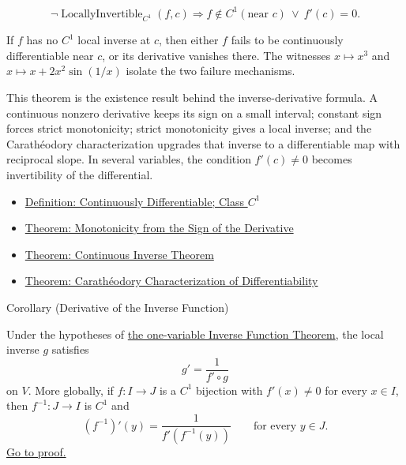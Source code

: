 \begin{remark*}
\[
  \neg\operatorname{LocallyInvertible}_{C^1}(f,c)
  \Longrightarrow
  f\notin C^1(\text{near }c)\ \vee\ f'(c)=0.
\]
\end{remark*}

\begin{remark*}
If \(f\) has no \(C^1\) local inverse at \(c\), then either \(f\) fails to be
continuously differentiable near \(c\), or its derivative vanishes there.
The witnesses \(x\mapsto x^3\) and \(x\mapsto x+2x^2\sin(1/x)\) isolate the
two failure mechanisms.
\end{remark*}

\begin{remark*}[Interpretation]
This theorem is the existence result behind the inverse-derivative formula. A continuous nonzero derivative keeps its sign on a small interval; constant sign forces strict monotonicity; strict monotonicity gives a local inverse; and the Carath\'{e}odory characterization upgrades that inverse to a differentiable map with reciprocal slope. In several variables, the condition \(f'(c)\neq 0\) becomes invertibility of the differential.
\end{remark*}

\begin{dependencies}
\begin{itemize}
  \item \hyperref[def:class-c1]{Definition: Continuously Differentiable; Class \(C^1\)}
  \item \hyperref[thm:nondecreasing-iff-nonneg-derivative]{Theorem: Monotonicity from the Sign of the Derivative}
  \item \hyperref[thm:continuous-inverse-theorem]{Theorem: Continuous Inverse Theorem}
  \item \hyperref[thm:caratheodory-characterization-of-differentiability]{Theorem: Carath\'{e}odory Characterization of Differentiability}
\end{itemize}
\end{dependencies}

\begin{corollarybox}{Corollary (Derivative of the Inverse Function)}
\begin{corollary}
\label{cor:inverse-function-derivative}
Under the hypotheses of \hyperref[thm:inverse-function-theorem-one-variable]{the one-variable Inverse Function Theorem}, the local inverse \(g\) satisfies
\[
  g'=\frac{1}{f'\circ g}
\]
on \(V\). More globally, if \(f:I\to J\) is a \(C^1\) bijection with \(f'(x)\neq 0\) for every \(x\in I\), then \(f^{-1}:J\to I\) is \(C^1\) and
\[
  (f^{-1})'(y)=\frac{1}{f'(f^{-1}(y))}
  \qquad\text{for every }y\in J.
\]
\hyperref[prf:inverse-function-derivative]{Go to proof.}
\end{corollary}
\end{corollarybox}

